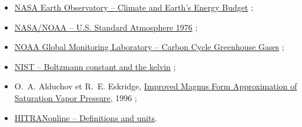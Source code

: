 \documentclass[11pt,a4paper]{article}
\begin{document}
\begin{itemize}[leftmargin=*,itemsep=3pt]
  \item \href{https://science.nasa.gov/earth/earth-observatory/climate-and-earths-energy-budget/}{NASA Earth Observatory -- Climate and Earth's Energy Budget} ;
  \item \href{https://www.ngdc.noaa.gov/stp/space-weather/online-publications/miscellaneous/us-standard-atmosphere-1976/us-standard-atmosphere_st76-1562_noaa.pdf}{NASA/NOAA -- U.S. Standard Atmosphere 1976} ;
  \item \href{https://gml.noaa.gov/ccgg/}{NOAA Global Monitoring Laboratory -- Carbon Cycle Greenhouse Gases} ;
  \item \href{https://www.nist.gov/si-redefinition/kelvin/kelvin-boltzmann-constant}{NIST -- Boltzmann constant and the kelvin} ;
  \item O.~A. Alduchov et R.~E. Eskridge,
  \href{https://doi.org/10.1175/1520-0450(1996)035\%3C0601:imfaos\%3E2.0.co;2}{Improved Magnus Form Approximation of Saturation Vapor Pressure}, 1996 ;
  \item \href{https://hitran.org/docs/definitions-and-units/}{HITRANonline -- Definitions and units}.
\end{itemize}
\end{document}
